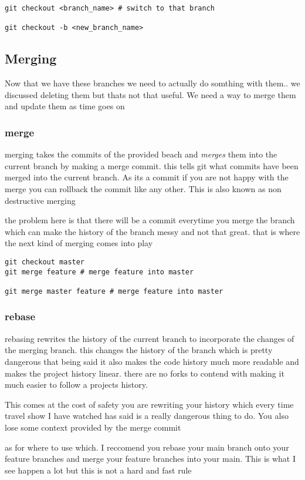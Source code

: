 \documentclass[a4paper]{article}
\begin{document}
\begin{verbatim}
git checkout <branch_name> # switch to that branch

git checkout -b <new_branch_name>
\end{verbatim}
\subsection*{Merging}
\label{sec:org4eeca31}
\begin{notes}
	Now that we have these branches we need to actually do somthing with them.. we
	discussed deleting them but thats not that useful. We need a way to merge them
	and update them as time goes on
\end{notes}
\subsubsection*{merge}
\label{sec:org97b5d50}
\begin{notes}
	merging takes the commits of the provided beach and \emph{merges} them into the current
	branch by making a merge commit. this tells git what commits have been merged
	into the current branch. As its a commit if you are not happy with the merge you
	can rollback the commit like any other. This is also known as non destructive
	merging

	the problem here is that there will be a commit everytime you merge the branch
	which can make the history of the branch messy and not that great. that is where
	the next kind of merging comes into play
\end{notes}

\begin{verbatim}
git checkout master
git merge feature # merge feature into master

git merge master feature # merge feature into master
\end{verbatim}

\subsubsection*{rebase}
\label{sec:orgc35e888}
\begin{notes}
	rebasing rewrites the history of the current branch to incorporate the changes
	of the merging branch. this changes the history of the branch which is pretty
	dangerous that being said it also makes the code history much more readable
	and makes the project history linear. there are no forks to contend with making
	it much easier to follow a projects history.

	This comes at the cost of safety you are rewriting your history which every time
	travel show I have watched has said is a really dangerous thing to do. You also
	lose some context provided by the merge commit

	as for where to use which. I
	reccomend you rebase your main branch onto your feature branches and merge your
	feature branches into your main. This is what I see happen a lot but this is not
	a hard and fast rule
\end{notes}
\end{document}
